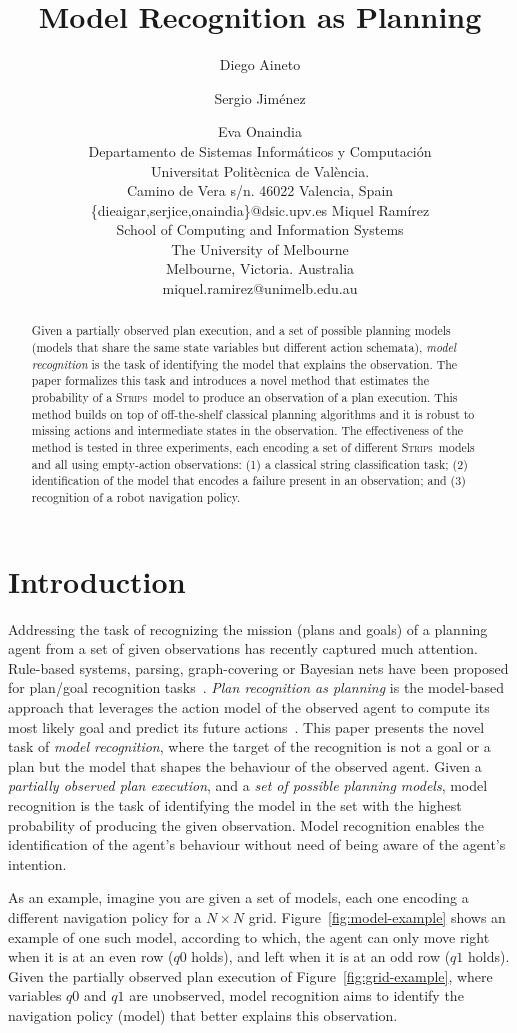 \documentclass[letterpaper]{article} %
\title{Model Recognition as Planning}
\author{Diego Aineto \and Sergio Jim\'enez\and Eva Onaindia\\
Departamento de Sistemas Inform\'aticos y Computaci\'on\\
Universitat Polit\`ecnica de Val\`encia.\\
Camino de Vera s/n. 46022 Valencia, Spain\\
\{dieaigar,serjice,onaindia\}@dsic.upv.es
\And Miquel Ram\'irez\\
School of Computing and Information Systems\\
The University of Melbourne\\
Melbourne, Victoria. Australia\\
miquel.ramirez@unimelb.edu.au}
\newcommand{\strips}{\textsc{Strips}}     %
\begin{document}
\maketitle
\begin{abstract}
Given a partially observed plan execution, and a set of possible planning models (models that share the same state variables but different action schemata), {\em model recognition} is the task of identifying the model that explains the observation. The paper formalizes this task and introduces a novel method that estimates the probability of a \strips\ model to produce an observation of a plan execution. This method builds on top of off-the-shelf classical planning algorithms and it is robust to missing actions and intermediate states in the observation. The effectiveness of the method is tested in three experiments, each encoding a set of different \strips\ models and all using empty-action observations: (1) a classical string classification task; (2) identification of the model that encodes a failure present in an observation; and (3) recognition of a robot navigation policy.
\end{abstract}

\section{Introduction}
\label{sec:introduction}


Addressing the task of recognizing the mission (plans and goals) of a planning agent from a set of given observations has recently captured much attention. Rule-based systems, parsing, graph-covering or Bayesian nets have been proposed for plan/goal recognition tasks~\cite{sukthankar14}. {\em Plan recognition as planning} is the model-based approach that leverages the action model of the observed agent to compute its most likely goal and predict its future actions~\cite{ramirez2009plan,RamirezG10}. This paper presents the novel task of \emph{model recognition}, where the target of the recognition is not a goal or a plan but the model that shapes the behaviour of the observed agent. Given a \emph{partially observed plan execution}, and a \emph{set of possible planning models}, model recognition is the task of identifying the model in the set with the highest probability of producing the given observation. Model recognition enables the identification of the agent's behaviour without need of being aware of the agent's intention.


As an example, imagine you are given a set of models, each one encoding a different navigation policy for a $N\times N$ grid. Figure~\ref{fig:model-example} shows an example of one such model, according to which, the agent can only move right when it is at an even row ({\tt\small $q0$} holds), and left when it is at an odd row ({\tt\small $q1$} holds). Given the partially observed plan execution of Figure~\ref{fig:grid-example}, where variables {\small\tt $q0$} and {\small\tt $q1$} are unobserved, model recognition aims to identify the navigation policy (model) that better explains this observation.
\end{document}
